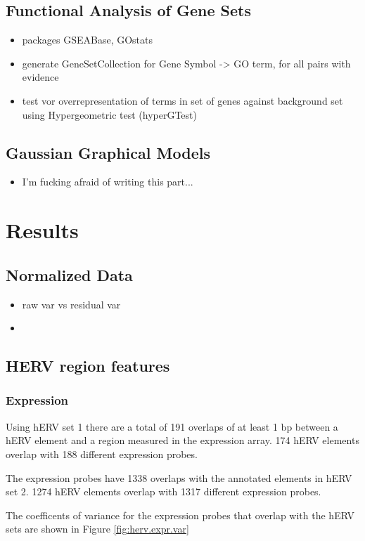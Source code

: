 \documentclass[a4paper,12pt]{article}
\begin{document}
\subsection{Functional Analysis of Gene Sets}
\begin{itemize}
\item packages GSEABase, GOstats
\item generate GeneSetCollection for Gene Symbol -> GO term, for all pairs with evidence
\item test vor overrepresentation of terms in set of genes against background set using Hypergeometric test (hyperGTest)
\end{itemize}
\subsection{Gaussian Graphical Models}
\begin{itemize}
\item I'm fucking afraid of writing this part...
\end{itemize}

\newpage
\section{Results}
\subsection{Normalized Data}
\begin{itemize}
\item raw var vs residual var
\item 
\end{itemize}
\subsection{HERV region features}
\subsubsection{Expression}
Using hERV set 1 there are a total of 191 overlaps of at least 1 bp between a hERV element and a region measured in the expression array. 174 hERV elements overlap with 188 different expression probes. 

The expression probes have 1338 overlaps with the annotated elements in hERV set 2. 1274 hERV elements overlap with 1317 different expression probes.

The coefficents of variance for the expression probes that overlap with the hERV sets are shown in Figure \ref{fig:herv.expr.var}
\end{document}
